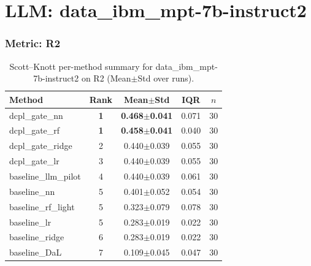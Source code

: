 \section*{LLM: data\_ibm\_mpt-7b-instruct2}

\subsubsection*{Metric: R2}
\begin{table}[H]
\centering
\scriptsize
\setlength{\tabcolsep}{4pt}
\renewcommand{\arraystretch}{1.1}
\caption{Scott--Knott per-method summary for data\_ibm\_mpt-7b-instruct2 on R2 (Mean$\pm$Std over runs).}
\label{tab:sk_data_ibm_mpt-7b-instruct2_R2}
\begin{tabular}{l|c|c|c|c}
\hline
\textbf{Method} & \textbf{Rank} & \textbf{Mean$\pm$Std} & \textbf{IQR} & \textbf{$n$} \\
\hline
\rowcolor{red!15} dcpl\_gate\_nn & \textbf{1} & \textbf{0.468$\pm$0.041} & 0.071 & 30 \\
\rowcolor{red!15} dcpl\_gate\_rf & \textbf{1} & \textbf{0.458$\pm$0.041} & 0.040 & 30 \\
dcpl\_gate\_ridge & 2 & 0.440$\pm$0.039 & 0.055 & 30 \\
dcpl\_gate\_lr & 3 & 0.440$\pm$0.039 & 0.055 & 30 \\
baseline\_llm\_pilot & 4 & 0.440$\pm$0.039 & 0.061 & 30 \\
baseline\_nn & 5 & 0.401$\pm$0.052 & 0.054 & 30 \\
baseline\_rf\_light & 5 & 0.323$\pm$0.079 & 0.078 & 30 \\
baseline\_lr & 5 & 0.283$\pm$0.019 & 0.022 & 30 \\
baseline\_ridge & 6 & 0.283$\pm$0.019 & 0.022 & 30 \\
baseline\_DaL & 7 & 0.109$\pm$0.045 & 0.047 & 30 \\
\hline
\end{tabular}
\end{table}


